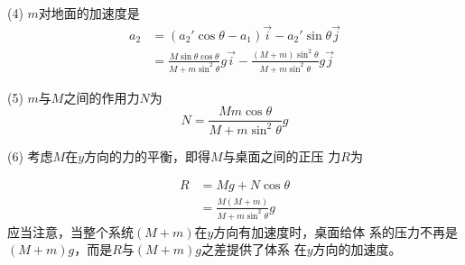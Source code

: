 \documentclass[../outline-of-mechanics.tex]{subfiles}
\begin{document}
(4) $ m $对地面的加速度是
\begin{align*}
  a _ { 2 } & = \left( a _ { 2 }' \cos \theta - a _ { 1 } \right) \vec{i} - a _ 2 ' \sin \theta \vec{j}                                                                                  \\
            & = \frac { M \sin \theta \cos \theta } { M + m \sin ^ { 2 } \theta } g \vec{i} - \frac { \left( M + m \right) \sin ^ { 2 } \theta } { M + m \sin ^ { 2 } \theta } g \vec{j}
\end{align*}

(5) $ m $与$ M $之间的作用力$ N $为
\begin{equation*}
  N = \frac { M m \cos \theta } { M + m \sin ^ { 2 } \theta } g
\end{equation*}

(6) 考虑$ M $在$ y $方向的力的平衡，即得$ M $与桌面之间的正压
力$ R $为

\begin{align*}
  R & = M g + N \cos \theta                                              \\
    & = \frac { M \left( M + m \right) } { M + m \sin ^ { 2 } \theta } g
\end{align*}
应当注意，当整个系统$ \left( M + m \right) $在$ y $方向有加速度时，桌面给体
系的压力不再是$ \left( M + m \right) g $，而是$ R $与$ \left( M + m \right) g $之差提供了体系
在$ y $方向的加速度。
\end{document}
